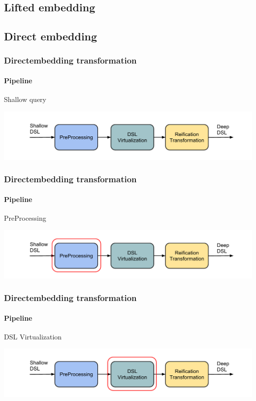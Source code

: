 \documentclass[xcolor=dvipsnames]{beamer}
\theoremstyle{definition}
\begin{document}
\subsection{Lifted embedding} %
\label{sub:Liftedembedding}


\subsection{Direct embedding} %
\label{sub:Direct embedding}

\begin{frame}[fragile]
    \frametitle{Directembedding transformation}
    \framesubtitle{Pipeline}
    \begin{block}{Shallow query}
        
    \end{block}
    \begin{center}
        \includegraphics[width=\textwidth]{img/pipeline1.pdf}
    \end{center}
\end{frame}

\begin{frame}[fragile]
    \frametitle{Directembedding transformation}
    \framesubtitle{Pipeline}
    \begin{block}{PreProcessing}
        
    \end{block}
    \begin{center}
        \includegraphics[width=\textwidth]{img/pipeline2.pdf}
    \end{center}
\end{frame}


\begin{frame}[fragile]
    \frametitle{Directembedding transformation}
    \framesubtitle{Pipeline}
    \begin{block}{DSL Virtualization}
        
    \end{block}
    \begin{center}
        \includegraphics[width=\textwidth]{img/pipeline3.pdf}
    \end{center}
\end{frame}
\end{document}
